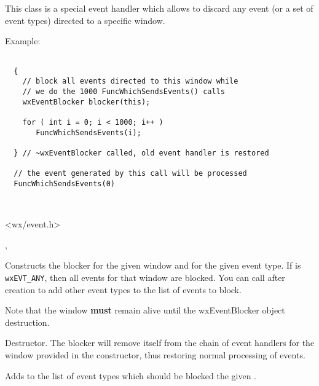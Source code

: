 \section{}\label{wxeventblocker}

This class is a special event handler which allows to discard
any event (or a set of event types) directed to a specific window.

Example:

\begin{verbatim}

  {
    // block all events directed to this window while
    // we do the 1000 FuncWhichSendsEvents() calls
    wxEventBlocker blocker(this);

    for ( int i = 0; i < 1000; i++ )
       FuncWhichSendsEvents(i);

  } // ~wxEventBlocker called, old event handler is restored

  // the event generated by this call will be processed
  FuncWhichSendsEvents(0)
\end{verbatim}



\\


<wx/event.h>




,



\label{wxeventblockerctor}


Constructs the blocker for the given window and for the given event type.
If  is \texttt{wxEVT\_ANY}, then all events for that window are
blocked. You can call  after creation to
add other event types to the list of events to block.

Note that the  window \textbf{must} remain alive until the
wxEventBlocker object destruction.


\label{wxeventblockerdtor}


Destructor. The blocker will remove itself from the chain of event handlers for
the window provided in the constructor, thus restoring normal processing of
events.


\label{wxeventblockerblock}


Adds to the list of event types which should be blocked the given .

